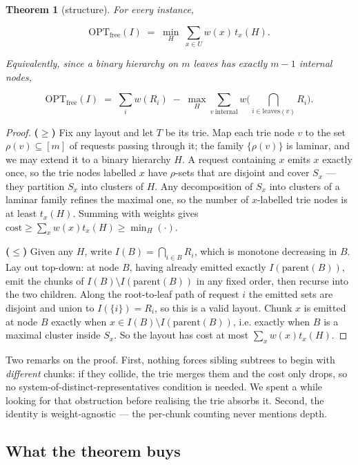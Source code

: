 \documentclass[11pt]{article}
\theoremstyle{plain}
\newtheorem{theorem}{Theorem}
\begin{document}
\begin{theorem}[structure]
For every instance,

\[
\mathrm{OPT}_{\mathrm{free}}(I) \;=\; \min_{H}\ \sum_{x \in U} w(x)\, t_x(H).
\]

Equivalently, since a binary hierarchy on $m$ leaves has exactly $m-1$ internal nodes,

\[
\mathrm{OPT}_{\mathrm{free}}(I) \;=\; \sum_i w(R_i) \;-\; \max_{H} \sum_{v\ \mathrm{internal}} w\Big(\bigcap_{i \in \mathrm{leaves}(v)} R_i\Big).
\]
\end{theorem}
\begin{proof}
\textbf{($\ge$)} Fix any layout and let $T$ be its trie. Map each trie node $v$ to the set $\rho(v) \subseteq [m]$ of requests passing through it; the family $\{\rho(v)\}$ is laminar, and we may extend it to a binary hierarchy $H$. A request containing $x$ emits $x$ exactly once, so the trie nodes labelled $x$ have $\rho$-sets that are disjoint and cover $S_x$ --- they partition $S_x$ into clusters of $H$. Any decomposition of $S_x$ into clusters of a laminar family refines the maximal one, so the number of $x$-labelled trie nodes is at least $t_x(H)$. Summing with weights gives $\mathrm{cost} \ge \sum_x w(x) t_x(H) \ge \min_H(\cdot)$.

\textbf{($\le$)} Given any $H$, write $I(B) = \bigcap_{i\in B}R_i$, which is monotone decreasing in $B$. Lay out top-down: at node $B$, having already emitted exactly $I(\mathrm{parent}(B))$, emit the chunks of $I(B)\setminus I(\mathrm{parent}(B))$ in any fixed order, then recurse into the two children. Along the root-to-leaf path of request $i$ the emitted sets are disjoint and union to $I(\{i\}) = R_i$, so this is a valid layout. Chunk $x$ is emitted at node $B$ exactly when $x \in I(B) \setminus I(\mathrm{parent}(B))$, i.e. exactly when $B$ is a maximal cluster inside $S_x$. So the layout has cost at most $\sum_x w(x)t_x(H)$. 
\end{proof}

Two remarks on the proof. First, nothing forces sibling subtrees to begin with \emph{different} chunks: if they collide, the trie merges them and the cost only drops, so no system-of-distinct-representatives condition is needed. We spent a while looking for that obstruction before realising the trie absorbs it. Second, the identity is weight-agnostic --- the per-chunk counting never mentions depth.

\subsection{What the theorem buys}
\end{document}
